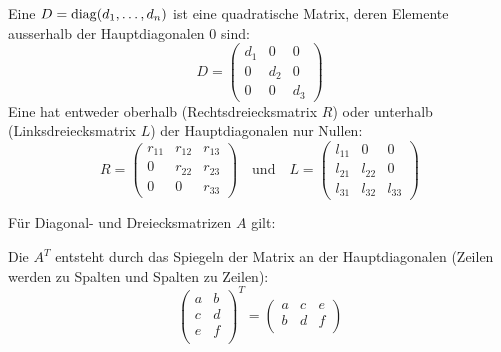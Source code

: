 
\begin{defbox}
Eine  $D = \operatorname{diag}(d_1, \dots, d_n)$ ist eine quadratische Matrix, deren Elemente ausserhalb der Hauptdiagonalen $0$ sind:
\[ D = \begin{pmatrix} d_1 & 0 & 0 \\ 0 & d_2 & 0 \\ 0 & 0 & d_3 \end{pmatrix} \]
Eine  hat entweder oberhalb (Rechtsdreiecksmatrix $R$) oder unterhalb (Linksdreiecksmatrix $L$) der Hauptdiagonalen nur Nullen:
\[
R = \begin{pmatrix} r_{11} & r_{12} & r_{13} \\ 0 & r_{22} & r_{23} \\ 0 & 0 & r_{33} \end{pmatrix}
\quad \text{und} \quad
L = \begin{pmatrix} l_{11} & 0 & 0 \\ l_{21} & l_{22} & 0 \\ l_{31} & l_{32} & l_{33} \end{pmatrix}
\]
\end{defbox}

\begin{defbox}[Eigenschaften][weight=quiet]
Für Diagonal- und Dreiecksmatrizen $A$ gilt:
  \begin{ZSFlist}
  \end{ZSFlist}
\end{defbox}


\begin{defbox}
Die  $A^T$ entsteht durch das Spiegeln der Matrix an der Hauptdiagonalen (Zeilen werden zu Spalten und Spalten zu Zeilen):
\[
\begin{pmatrix}
  a & b \\
  c & d \\
  e & f \\
\end{pmatrix}^T
=
\begin{pmatrix}
  a & c & e \\
  b & d & f \\
\end{pmatrix}
\]
\end{defbox}

